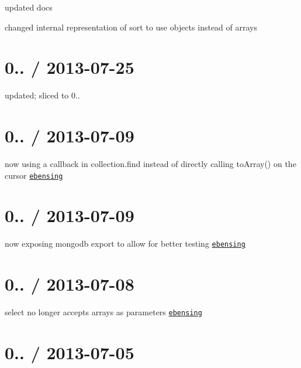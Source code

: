 \begin{DoxyItemize}
\item updated docs
\item changed internal representation of {\ttfamily sort} to use objects instead of arrays
\end{DoxyItemize}

\section*{0.. / 2013-\/07-\/25 }


\begin{DoxyItemize}
\item updated; sliced to 0..
\end{DoxyItemize}

\section*{0.. / 2013-\/07-\/09 }


\begin{DoxyItemize}
\item now using a callback in collection.\+find instead of directly calling to\+Array() on the cursor \href{https://github.com/ebensing}{\tt ebensing}
\end{DoxyItemize}

\section*{0.. / 2013-\/07-\/09 }


\begin{DoxyItemize}
\item now exposing mongodb export to allow for better testing \href{https://github.com/ebensing}{\tt ebensing}
\end{DoxyItemize}

\section*{0.. / 2013-\/07-\/08 }


\begin{DoxyItemize}
\item select no longer accepts arrays as parameters \href{https://github.com/ebensing}{\tt ebensing}
\end{DoxyItemize}

\section*{0.. / 2013-\/07-\/05 }


